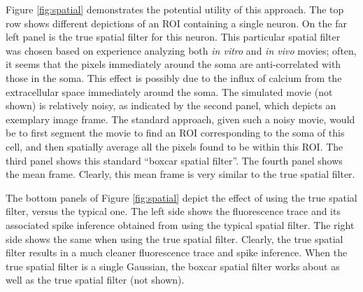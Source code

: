 \documentclass{article}
\begin{document}
Figure \ref{fig:spatial} demonstrates the potential utility of this approach.  The top row shows different depictions of an ROI containing a single neuron.  On the far left panel is the true spatial filter for this neuron.  This particular spatial filter was chosen based on experience analyzing both \emph{in vitro} and \emph{in vivo} movies; often, it seems that the pixels immediately around the soma are anti-correlated with those in the soma.  This effect is possibly due to the influx of calcium from the extracellular space immediately around the soma.  The simulated movie (not shown) is relatively noisy, as indicated by the second panel, which depicts an exemplary image frame.  The standard approach, given such a noisy movie, would be to first segment the movie to find an ROI corresponding to the soma of this cell, and then spatially average all the pixels found to be within this ROI.  The third panel shows this standard ``boxcar spatial filter''.  The fourth panel shows the mean frame.  Clearly, this mean frame is very similar to the true spatial filter.  

The bottom panels of Figure \ref{fig:spatial} depict the effect of using the true spatial filter, versus the typical one. The left side shows the fluorescence trace and its associated spike inference obtained from using the typical spatial filter.  The right side shows the same when using the true spatial filter.  Clearly, the true spatial filter results in a much cleaner fluorescence trace and spike inference.  When the true spatial filter is a single Gaussian, the boxcar spatial filter works about as well as the true spatial filter (not shown).
\end{document}
